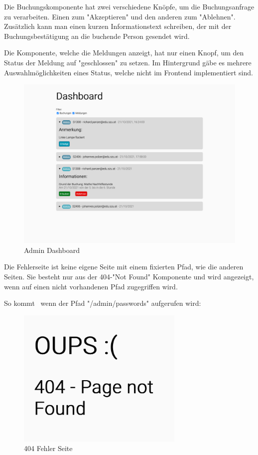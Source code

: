 Die Buchungskomponente hat zwei verschiedene Knöpfe, um die Buchungsanfrage zu verarbeiten. Einen zum "Akzeptieren" und den anderen zum "Ablehnen". Zusätzlich kann man einen kurzen Informationstext schreiben, der mit der Buchungsbestätigung an die buchende Person gesendet wird. 

Die Komponente, welche die Meldungen anzeigt, hat nur einen Knopf, um den Status der Meldung auf "geschlossen" zu setzen. Im Hintergrund gäbe es mehrere Auswahlmöglichkeiten eines Status, welche nicht im Frontend implementiert sind.

\begin{figure}[H]
    \centering
    \includegraphics[width=120mm]{media/WebComponents/AdminSeite_light.png}
    \caption{Admin Dashboard}
    \label{fig:admindashboard}
\end{figure}

\begin{minipage}{\textwidth}
    Die Fehlerseite ist keine eigene Seite mit einem fixierten Pfad, wie die anderen Seiten. Sie besteht nur aus der 404-"Not Found" Komponente und wird angezeigt, wenn auf einen nicht vorhandenen Pfad zugegriffen wird. 
\end{minipage}

So kommt \zb\ wenn der Pfad "{\ttfamily /admin/passwords}" aufgerufen wird:
    
\begin{figure}[H]
    \centering
    \includegraphics[width=80mm]{media/WebComponents/404.png}
    \caption{404 Fehler Seite}
\end{figure}